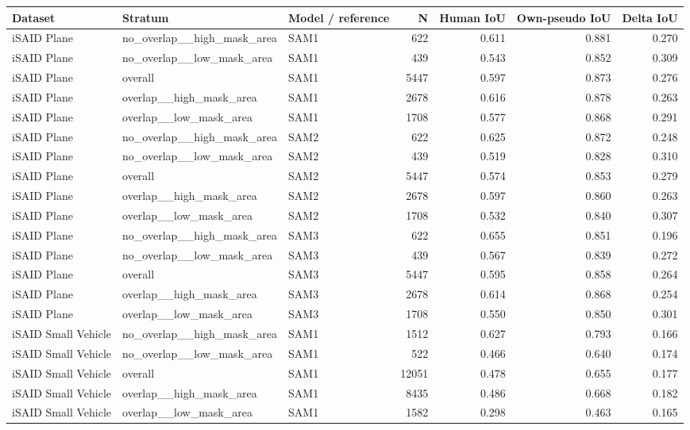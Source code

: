 \begin{tabular}{lllrrrr}
\toprule
Dataset & Stratum & Model / reference & N & Human IoU & Own-pseudo IoU & Delta IoU \\
\midrule
iSAID Plane & no\_overlap\_\_high\_mask\_area & SAM1 & 622 & 0.611 & 0.881 & 0.270 \\
iSAID Plane & no\_overlap\_\_low\_mask\_area & SAM1 & 439 & 0.543 & 0.852 & 0.309 \\
iSAID Plane & overall & SAM1 & 5447 & 0.597 & 0.873 & 0.276 \\
iSAID Plane & overlap\_\_high\_mask\_area & SAM1 & 2678 & 0.616 & 0.878 & 0.263 \\
iSAID Plane & overlap\_\_low\_mask\_area & SAM1 & 1708 & 0.577 & 0.868 & 0.291 \\
iSAID Plane & no\_overlap\_\_high\_mask\_area & SAM2 & 622 & 0.625 & 0.872 & 0.248 \\
iSAID Plane & no\_overlap\_\_low\_mask\_area & SAM2 & 439 & 0.519 & 0.828 & 0.310 \\
iSAID Plane & overall & SAM2 & 5447 & 0.574 & 0.853 & 0.279 \\
iSAID Plane & overlap\_\_high\_mask\_area & SAM2 & 2678 & 0.597 & 0.860 & 0.263 \\
iSAID Plane & overlap\_\_low\_mask\_area & SAM2 & 1708 & 0.532 & 0.840 & 0.307 \\
iSAID Plane & no\_overlap\_\_high\_mask\_area & SAM3 & 622 & 0.655 & 0.851 & 0.196 \\
iSAID Plane & no\_overlap\_\_low\_mask\_area & SAM3 & 439 & 0.567 & 0.839 & 0.272 \\
iSAID Plane & overall & SAM3 & 5447 & 0.595 & 0.858 & 0.264 \\
iSAID Plane & overlap\_\_high\_mask\_area & SAM3 & 2678 & 0.614 & 0.868 & 0.254 \\
iSAID Plane & overlap\_\_low\_mask\_area & SAM3 & 1708 & 0.550 & 0.850 & 0.301 \\
iSAID Small Vehicle & no\_overlap\_\_high\_mask\_area & SAM1 & 1512 & 0.627 & 0.793 & 0.166 \\
iSAID Small Vehicle & no\_overlap\_\_low\_mask\_area & SAM1 & 522 & 0.466 & 0.640 & 0.174 \\
iSAID Small Vehicle & overall & SAM1 & 12051 & 0.478 & 0.655 & 0.177 \\
iSAID Small Vehicle & overlap\_\_high\_mask\_area & SAM1 & 8435 & 0.486 & 0.668 & 0.182 \\
iSAID Small Vehicle & overlap\_\_low\_mask\_area & SAM1 & 1582 & 0.298 & 0.463 & 0.165 \\

\end{tabular}
